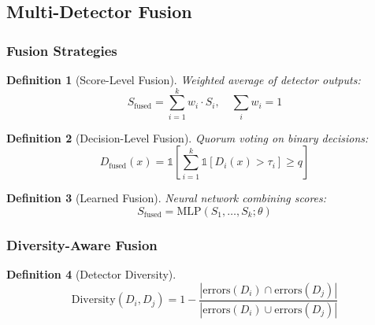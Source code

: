 \documentclass[
]{article}
\newtheorem{definition}{Definition}[section]
\begin{document}
\subsection{Multi-Detector Fusion}\label{sec:detector-fusion}

\subsubsection{Fusion Strategies}\label{fusion-strategies}

\begin{definition}[Score-Level Fusion]
\label{def:score-fusion}
Weighted average of detector outputs:
\begin{equation}
\label{eq:score-fusion}
S_{\text{fused}} = \sum_{i=1}^k w_i \cdot S_i, \quad \sum_i w_i = 1
\end{equation}
\end{definition}

\begin{definition}[Decision-Level Fusion]
\label{def:decision-fusion}
Quorum voting on binary decisions:
\begin{equation}
\label{eq:decision-fusion}
D_{\text{fused}}(x) = \mathbb{1}\left[\sum_{i=1}^k \mathbb{1}[D_i(x) > \tau_i] \geq q\right]
\end{equation}
\end{definition}

\begin{definition}[Learned Fusion]
\label{def:learned-fusion}
Neural network combining scores:
\begin{equation}
\label{eq:learned-fusion}
S_{\text{fused}} = \text{MLP}(S_1, \ldots, S_k; \theta)
\end{equation}
\end{definition}

\subsubsection{Diversity-Aware Fusion}\label{diversity-aware-fusion}

\begin{definition}[Detector Diversity]
\label{def:detector-diversity}
\begin{equation}
\label{eq:detector-diversity}
\text{Diversity}(D_i, D_j) = 1 - \frac{|\text{errors}(D_i) \cap \text{errors}(D_j)|}{|\text{errors}(D_i) \cup \text{errors}(D_j)|}
\end{equation}
\end{definition}
\end{document}
